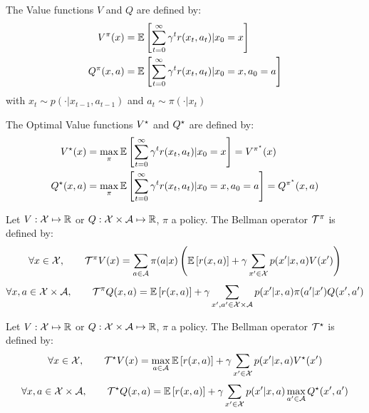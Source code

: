 \documentclass[10pt]{beamer}
\begin{document}
\begin{frame}
    \begin{definition}
        The Value functions $V$ and $Q$ are defined by:
        \begin{align*}
            V^\pi(x) &= \mathbb{E}\left[ \sum_{t=0}^\infty  \gamma^t r(x_t, a_t) | x_0 = x \right] \\
            Q^\pi(x,a) &= \mathbb{E}\left[ \sum_{t=0}^\infty  \gamma^t r(x_t, a_t) | x_0 = x, a_0 = a \right]
        \end{align*}
        with $x_t \sim p(\cdot | x_{t-1}, a_{t-1})$ and $a_t \sim \pi(\cdot | x_t)$
    \end{definition}

    \begin{definition}
        The Optimal Value functions $V^{\star}$ and $Q^{\star}$ are defined by:
        \begin{align*}
            V^{\star}(x) &= \max_{\pi} \mathbb{E}\left[ \sum_{t=0}^\infty  \gamma^t r(x_t, a_t) | x_0 = x \right] = V^{\pi^{\star}}(x)\\
            Q^{\star}(x,a) &= \max_{\pi} \mathbb{E}\left[ \sum_{t=0}^\infty  \gamma^t r(x_t, a_t) | x_0 = x, a_0 = a \right] = Q^{\pi^{\star}} (x,a)
        \end{align*}
    \end{definition}
\end{frame}

\begin{frame}
    \begin{definition}
        Let $V: \mathcal{X} \mapsto \mathbb{R}$ or $Q: \mathcal{X} \times \mathcal{A} \mapsto \mathbb{R}$, $\pi$ a policy. The Bellman operator $\mathcal{T}^\pi$ is defined by:
        \[ \forall x \in \mathcal{X}, \qquad \mathcal{T}^\pi V(x) = \sum_{a \in \mathcal{A}} \pi(a|x) \left( \mathbb{E}\left[ r(x,a) \right] + \gamma \sum_{x^\prime  \in \mathcal{X}} p(x^\prime |x,a)V(x^\prime ) \right) \]
        \[ \forall x,a \in \mathcal{X} \times \mathcal{A}, \qquad \mathcal{T}^\pi Q(x,a) = \mathbb{E}\left[ r(x,a) \right] + \gamma \sum_{x^\prime ,a^\prime  \in \mathcal{X} \times \mathcal{A}} p(x^\prime |x,a)\pi(a^\prime |x^\prime )Q(x^\prime ,a^\prime ) \]
    \end{definition}
    \begin{definition}
        Let $V: \mathcal{X} \mapsto \mathbb{R}$ or $Q: \mathcal{X} \times \mathcal{A} \mapsto \mathbb{R}$, $\pi$ a policy. The Bellman operator $\mathcal{T}^{\star}$ is defined by:
        \[ \forall x \in \mathcal{X}, \qquad \mathcal{T}^{\star} V(x) = \max_{a \in \mathcal{A}} \mathbb{E}\left[ r(x,a) \right] + \gamma \sum_{x^\prime  \in \mathcal{X}} p(x^\prime |x,a)V^{\star}(x^\prime ) \]
        \[ \forall x,a \in \mathcal{X} \times \mathcal{A}, \qquad \mathcal{T}^{\star} Q(x,a) = \mathbb{E}\left[ r(x,a) \right] + \gamma \sum_{x^\prime  \in \mathcal{X}} p(x^\prime |x,a)\max_{a^\prime  \in \mathcal{A}}Q^{\star}(x^\prime ,a^\prime ) \]
    \end{definition}
\end{frame}
\end{document}
